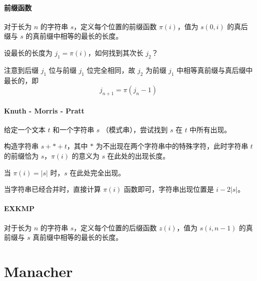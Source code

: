 \documentclass{probook}
\begin{document}
\begin{multicols}{2}
\paragraph{前缀函数}

对于长为 $n$ 的字符串 $s$，定义每个位置的前缀函数 $\pi(i)$，值为 $s(0,i)$ 的真后缀与 $s$ 的真前缀中相等的最长的长度。

设最长的长度为 $j_1=\pi(i)$，如何找到其次长 $j_2$？

注意到后缀 $j_1$ 位与前缀 $j_1$ 位完全相同，故 $j_2$ 为前缀 $j_1$ 中相等真前缀与真后缀中最长的，即
\[j_{n+1} = \pi(j_n-1)\]



\paragraph{Knuth - Morris - Pratt}

给定一个文本 $t$ 和一个字符串 $s$ （模式串），尝试找到 $s$ 在 $t$ 中所有出现。

构造字符串 $s+*+t$，其中 $*$ 为不出现在两个字符串中的特殊字符，此时字符串 $t$ 的前缀恰为 $s$，$\pi(i)$ 的意义为 $s$ 在此处的出现长度。

当 $\pi(i)=|s|$ 时，$s$ 在此处完全出现。

当字符串已经合并时，直接计算 $\pi(i)$ 函数即可，字符串出现位置是 $i-2|s|$。



\paragraph{EXKMP}

对于长为 $n$ 的字符串 $s$，定义每个位置的后缀函数 $z(i)$，值为 $s(i,n-1)$ 的真前缀与 $s$ 真前缀中相等的最长的长度。



\section{Manacher}





\end{multicols}
\end{document}
